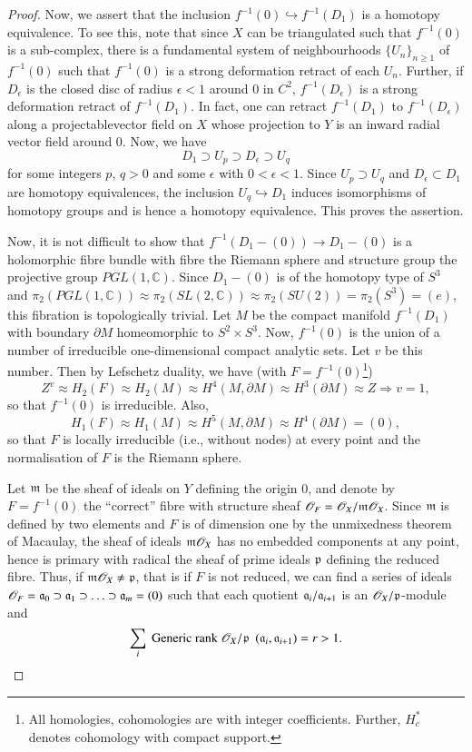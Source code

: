 \begin{proof}
Now, we assert that the inclusion $f^{-1} (0) \hookrightarrow f^{-1} (D_1)$ is a homotopy equivalence. To see this, note that since $X$ can be triangulated such that $f^{-1} (0)$ is a sub-complex, there is a fundamental system of neighbourhoods $\{U_n\}_{n \geq 1}$ of $f^{-1} (0)$ such that $f^{-1} (0)$ is a strong deformation retract of each $U_n$. Further, if $D_\epsilon$ is the closed disc of radius $\epsilon < 1$ around 0 in $C^2$, $f^{-1} (D_\epsilon)$ is a strong deformation retract of $f^{-1} (D_1)$. In fact, one can retract $f^{-1} (D_1)$ to $f^{-1} (D_\epsilon)$ along a projectable\pageoriginale  vector field on $X$ whose projection to $Y$ is an inward radial vector field around 0. Now, we have
$$
D_1 \supset U_p \supset D_\epsilon \supset U_q
$$
for some integers $p$, $q>0$ and some $\epsilon$ with $0 < \epsilon < 1$. Since $U_p \supset U_q$ and $D_\epsilon \subset D_1$ are homotopy equivalences, the inclusion $U_q \hookrightarrow D_1$ induces isomorphisms of homotopy groups and is hence a homotopy equivalence. This proves the assertion.

Now, it is not difficult to show that $f^{-1} (D_1 - (0)) \to D_1 - (0)$ is a holomorphic fibre bundle with fibre the Riemann sphere and structure group the projective group $PGL(1,\mathbb{C})$. Since $D_1 - (0)$ is of the homotopy type of $S^3$ and $\pi_2 (PGL (1, \mathbb{C})) \approx \pi_2 (SL (2, \mathbb{C})) \approx \pi_2 (SU (2)) = \pi_2 (S^3) = (e)$, this fibration is topologically trivial. Let $M$ be the compact manifold $f^{-1} (D_1)$ with boundary $\partial M$ homeomorphic to $S^2 \times S^3$. Now, $f^{-1} (0)$ is the union of a number of irreducible one-dimensional compact analytic sets. Let $v$ be this number. Then by  Lefschetz duality, we have (with $F = f^{-1} (0)$\footnote{All homologies, cohomologies are with integer coefficients. Further, $H^*_c$ denotes cohomology with compact support.})
$$
Z^v \approx H_2 (F) \approx H_2 (M) \approx H^4 (M, \partial M) \approx H^3 (\partial M) \approx Z \Rightarrow v = 1,
$$
so that $f^{-1} (0)$ is irreducible. Also,
$$
H_1  (F) \approx H_1(M) \approx H^5 (M, \partial M) \approx H^4 (\partial M) = (0),
$$
so that $F$ is locally irreducible (i.e., without nodes) at every point and the normalisation of $F$ is the Riemann sphere.

Let $\mathfrak{m}$ be the sheaf of ideals on $Y$ defining the origin 0, and denote by $F = f^{-1} (0)$ the ``correct'' fibre with structure sheaf $\mathscr{O}_F = \mathscr{O}_X / \mathfrak{m} \mathscr{O}_X$. Since $\mathfrak{m}$ is defined by two elements and $F$ is of dimension one by the unmixedness theorem of Macaulay, the sheaf of ideals $\mathfrak{m}\mathscr{O}_X$ has no embedded components at any point, hence is primary with radical the sheaf of prime ideals $\mathfrak{p}$ defining the reduced fibre. Thus, if $\mathfrak{m} \mathscr{O}_X \neq \mathfrak{p}$, that is if $F$ is not reduced, we can find a series of ideals $\mathscr{O}_F = \mathfrak{a}_0 \supset \mathfrak{a}_1\supset \ldots \supset \mathfrak{a}_m = (0)$   such that each quotient $\mathfrak{a}_i / \mathfrak{a}_{i+1}$ is an $\mathscr{O}_X / \mathfrak{p}$-module and 
$$
\sum\limits_{i} \text{ Generic rank } \mathscr{O}_X/ \mathfrak{p} ~~(\mathfrak{a}_i, \mathfrak{a}_{i+1}) =r > 1.
$$


\end{proof}
